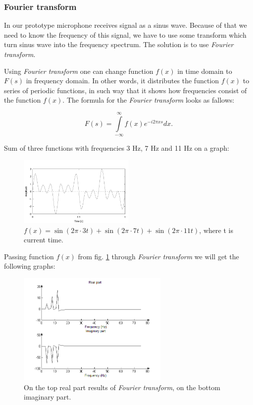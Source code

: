 \documentclass[11pt,titlepage]{article}
\theoremstyle{plain}
\begin{document}
\subsubsection{Fourier transform}
In our prototype microphone receives signal as a sinus wave. Because of that we need to know the frequency of this signal, we have to use some transform which turn sinus wave into the frequency spectrum. The solution is to use \textit{Fourier transform}.

Using \textit{Fourier transform} one can change function $f(x)$ in time domain to $F(s)$ in frequency domain. In other words, it distributes the function $f(x)$ to series of periodic functions, in such way that it shows how frequencies consist of the function $f(x)$. The formula for the \textit{Fourier transform} looks as fallows:

\begin{equation}
	F(s) = \int\limits^\infty_{-\infty} f(x) e^{-i2\pi xs} dx.
\end{equation}

Sum of three functions with frequencies 3 Hz, 7 Hz and 11 Hz on a graph:
\begin{figure}[H]
	\centering
	\includegraphics[width=0.5\textwidth]{img/sines}
	\caption{$f(x) = \sin(2\pi \cdot 3t)+\sin(2 \pi \cdot 7 t)+\sin(2  \pi \cdot 11  t)$, where t is current time.}
	\label{fig:F4}
\end{figure}

Passing function $f(x)$ from fig. \ref{fig:F4} through \textit{Fourier transform} we will get the following graphs:

\begin{figure}[H]
	\centering
	\includegraphics[width=0.65\textwidth]{img/both_real_imag}
	\caption{On the top real part results of \textit{Fourier transform}, on the bottom imaginary part.}
	\label{fig:F5}
\end{figure}
\end{document}
